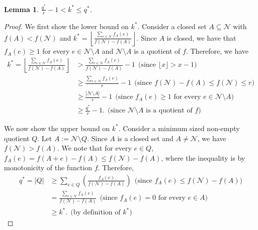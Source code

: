 \documentclass[11pt]{article}
\newtheorem{lemma}{Lemma}
\theoremstyle{definition}
\begin{document}
\begin{lemma}\label{lemma:opt-estimation}
    $\frac{q^*}{r}-1< k^*\leq q^*$.
\end{lemma}
\begin{proof}
    We first show the lower bound on $k^*$. Consider a closed set $A\subseteq \mathcal{N}$ with $f(A)<f(\mathcal{N})$ and $k^*=\left\lfloor\frac{\sum_{e\in \mathcal{N}}f_A(e)}{f(\mathcal{N})-f(A)}\right\rfloor$. Since $A$ is closed, we have that $f_A(e)\geq 1$ for every $e\in \mathcal{N}\setminus A$ and $\mathcal{N}\setminus A$ is a quotient of $f$. Therefore, we have
    $$\begin{aligned}
        k^*=\left\lfloor\frac{\sum_{e\in \mathcal{N}}f_A(e)}{f(\mathcal{N})-f(A)}\right\rfloor
        &> \frac{\sum_{e\in \mathcal{N}}f_A(e)}{f(\mathcal{N})-f(A)} -1 \ \ \text{(since $\lfloor x\rfloor > x-1$)}\\
        & \geq \frac{\sum_{e\in \mathcal{N}}f_A(e)}{r}-1 \ \ \text{(since $f(\mathcal{N})-f(A)\leq f(\mathcal{N})\leq r$)}\\
        & \geq \frac{|\mathcal{N}\setminus A|}{r}-1 \ \ \text{(since $f_A(e)\geq 1$ for every $e\in \mathcal{N}\setminus A$)}\\
        & \geq \frac{q^*}{r}-1. \ \ \text{(since $\mathcal{N}\setminus A$ is a quotient of $f$)}
    \end{aligned}$$

    We now show the upper bound on $k^*$. Consider a minimum sized non-empty quotient $Q$. Let $A:=\mathcal{N}\setminus Q$. Since $A$ is a closed set and $A\neq \mathcal{N}$, we have $f(\mathcal{N})>f(A)$. We note that for every $e\in Q$, $f_{A}(e)=f(A+e)-f(A)\leq f(\mathcal{N})-f(A)$, where the inequality is by monotonicity of the function $f$. Therefore,
    $$\begin{aligned}
        q^*=|Q| & \geq \sum_{e\in Q}\left(\frac{f_A(e)}{f(\mathcal{N})-f(A)}\right) \ \ \text{(since $f_A(e)\leq f(\mathcal{N})-f(A)$)}\\
        & = \frac{\sum_{e\in \mathcal{N}} f_{A}(e)}{f(\mathcal{N})-f(A)} \ \ \text{(since $f_A(e)=0$ for every $e\in A$)}\\
        & \geq k^*. \ \ \text{(by definition of $k^*$)}
    \end{aligned}$$
\end{proof}
\end{document}

